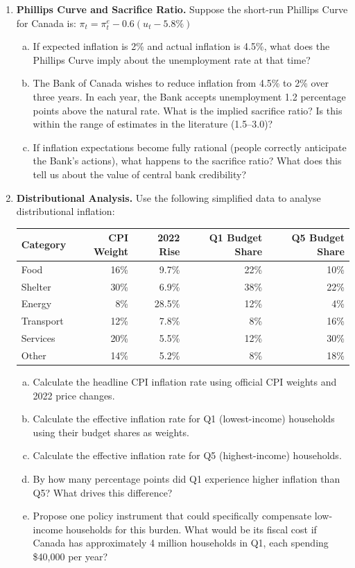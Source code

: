 \begin{enumerate}
\item \textbf{Phillips Curve and Sacrifice Ratio.}
Suppose the short-run Phillips Curve for Canada is:
$\pi_t = \pi^e_t - 0.6(u_t - 5.8\%)$
\begin{enumerate}[(a)]
  \item If expected inflation is 2\% and actual inflation is 4.5\%,
        what does the Phillips Curve imply about the unemployment rate
        at that time?
  \item The Bank of Canada wishes to reduce inflation from 4.5\% to 2\%
        over three years. In each year, the Bank accepts unemployment
        1.2 percentage points above the natural rate. What is the implied
        sacrifice ratio? Is this within the range of estimates in the
        literature (1.5--3.0)?
  \item If inflation expectations become fully rational (people correctly
        anticipate the Bank's actions), what happens to the sacrifice ratio?
        What does this tell us about the value of central bank credibility?
\end{enumerate}

\item \textbf{Distributional Analysis.}
Use the following simplified data to analyse distributional inflation:

\begin{center}
\begin{tabular}{lrrrr}
\toprule
Category & CPI Weight & 2022 Rise & Q1 Budget Share & Q5 Budget Share \\
\midrule
Food       & 16\% & 9.7\% & 22\% & 10\% \\
Shelter    & 30\% & 6.9\% & 38\% & 22\% \\
Energy     & 8\%  &28.5\% & 12\% &  4\% \\
Transport  & 12\% & 7.8\% &  8\% & 16\% \\
Services   & 20\% & 5.5\% & 12\% & 30\% \\
Other      & 14\% & 5.2\% &  8\% & 18\% \\
\bottomrule
\end{tabular}
\end{center}

\begin{enumerate}[(a)]
  \item Calculate the headline CPI inflation rate using official
        CPI weights and 2022 price changes.
  \item Calculate the effective inflation rate for Q1 (lowest-income)
        households using their budget shares as weights.
  \item Calculate the effective inflation rate for Q5 (highest-income)
        households.
  \item By how many percentage points did Q1 experience higher inflation
        than Q5? What drives this difference?
  \item Propose one policy instrument that could specifically compensate
        low-income households for this burden. What would be its fiscal cost
        if Canada has approximately 4 million households in Q1,
        each spending \$40{,}000 per year?
\end{enumerate}


\end{enumerate}

